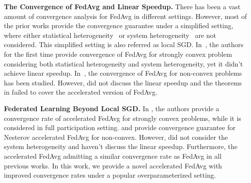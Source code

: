 \textbf{The Convergence of FedAvg and Linear Speedup.}
There has been a vast amount of convergence analysis for FedAvg in different settings. However, most of the prior works provide the
convergence guarantee under a simplified setting, where either statistical
heterogeneity~\cite{stich2018local,zhou2017convergence,wang2018cooperative,woodworth2018graph} or system
heterogeneity~\cite{yu2019parallel,wang2019adaptive,khaled2019first,jiang2018linear} are not
considered. This simplified setting is also referred as local SGD. 
In~\cite{li2019convergence},
the authors for the first time provide convergence of FedAvg for strongly convex problem considering both statistical heterogeneity and system heterogeneity, yet it
didn't achieve linear speedup. In~\cite{haddadpour2019convergence,liang2019variance,huo2020faster,jiang2018linear}, the convergence of FedAvg for non-convex problems has been studied. 
However, \cite{huo2020faster} did not discuss the linear speedup and the theorems in \cite{haddadpour2019convergence,liang2019variance} failed to cover the accelerated version of
FedAvg. 


\textbf{Federated Learning Beyond Local SGD.}
In \cite{liu2019accelerating}, the authors provide a convergence rate of accelerated FedAvg for strongly convex problems, while it is considered in full participation setting.
\cite{yu2019linear} and \citep{huo2020faster} provide
convergence guarantee for Nesterov accelerated FedAvg for non-convex. 
However, \cite{yu2019linear} did not consider the system heterogeneity and \cite{huo2020faster} haven't discuss the linear speedup.
Furthermore, the accelerated FedAvg admitting a similar convergence rate as FedAvg in all previous works.  In this work, we provide a novel accelerated FedAvg with improved convergence rates under a popular overparameterized setting. 






